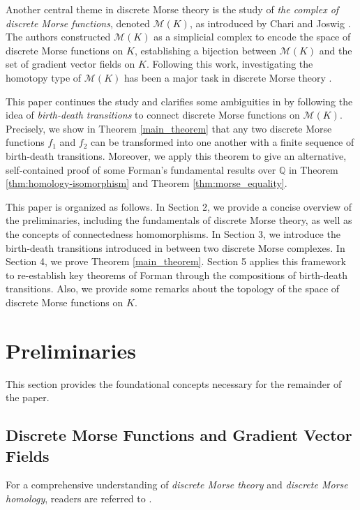 \documentclass[a4paper,12pt,notitlepage]{amsart}
\theoremstyle{definition}%
\theoremstyle{definition}%
\theoremstyle{definition}%
\newcommand{\M}{\mathcal{M}}
\begin{document}
Another central theme in discrete Morse theory 
 is the study of \textit{the complex of discrete Morse functions},
denoted $\M(K)$, as
introduced by Chari and Joswig \cite{chari}.
The authors constructed  
$\M(K)$ as a simplicial complex to encode 
the space of 
discrete Morse functions on $K$,
establishing a bijection between $\M(K)$
and the set of gradient vector fields on $K$.
Following this work,
 investigating the  homotopy type  of $\M(K)$ 
has been a major task in discrete Morse theory \cite{determined,homotopy_type,homotopy_type 2,higher connectivity of the morse complex}. 


This paper 
continues the study and clarifies some ambiguities  in \cite{no.2} by
 following the idea of  \textit{birth-death transitions}
to connect discrete Morse functions on $\M(K)$.
Precisely, 
we show in Theorem \ref{main_theorem} that 
any two  discrete Morse functions 
$f_1$ and $f_2$  can be transformed into 
one another
with a finite sequence of 
birth-death transitions.
Moreover, 
we apply this theorem to give an alternative, self-contained proof of some
Forman's fundamental results over $\mathbb{Q}$ in 
Theorem \ref{thm:homology-isomorphism}
and 
Theorem \ref{thm:morse_equality}.


This paper is organized as follows.
In Section 2, 
we provide a
 concise overview of the 
  preliminaries, 
 including 
 the fundamentals of
  discrete Morse theory,	
  as well as the concepts
   of connectedness homomorphisms.
In Section 3,
we introduce the birth-death transitions introduced in \cite{no.2}
between two discrete Morse complexes.
In Section 4,
we prove Theorem \ref{main_theorem}.
Section 5 applies this framework to re-establish key theorems of Forman 
through the compositions of birth-death transitions.
Also,
we provide some remarks about the topology of the space of 
discrete Morse functions on  $K$.
\section{Preliminaries}
This section provides the foundational concepts necessary for the remainder of the paper.


\subsection{Discrete Morse Functions and Gradient Vector Fields}
For a comprehensive
understanding 
of  \textit{discrete Morse theory } and \textit{discrete Morse homology},
readers are referred  
 to  \cite{Forman_guide, Morse Theory for Cell Complexes,Discrete Morse Theory Kozlov}.
\end{document}
